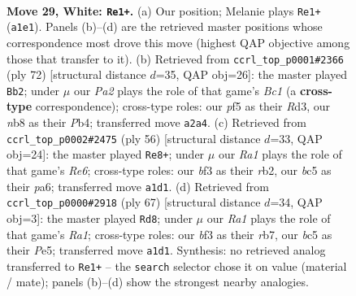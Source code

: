 \documentclass[11pt]{article}
\begin{document}
\clearpage

\begin{figure}[p]\centering
\begin{subfigure}{0.46\textwidth}\centering
\resizebox{\linewidth}{!}{%
\newchessgame
\chessboard[
  setfen={1n2k3/8/8/ppb2p2/8/5b2/P4r2/R5K1 w - - 0 29},
  showmover=false,
  pgfstyle=straightmove, color=movearrow, markmove={a1-e1}
]}
\caption{}
\end{subfigure}\hfill
\begin{subfigure}{0.46\textwidth}\centering
\resizebox{\linewidth}{!}{%
\newchessgame
\chessboard[
  setfen={8/pp4p1/4k3/8/1P2n3/3R4/P4b1K/R1B3r1 w - - 1 37},
  showmover=false,
  pgfstyle=straightmove, color=movearrow, markmove={c1-b2}
]}
\caption{}
\end{subfigure}
\\[4pt]
\begin{subfigure}{0.46\textwidth}\centering
\resizebox{\linewidth}{!}{%
\newchessgame
\chessboard[
  setfen={2k5/6R1/p1p1R3/8/8/2P5/Pr1r4/4K3 w - - 0 29},
  showmover=false,
  pgfstyle=straightmove, color=movearrow, markmove={e6-e8}
]}
\caption{}
\end{subfigure}\hfill
\begin{subfigure}{0.46\textwidth}\centering
\resizebox{\linewidth}{!}{%
\newchessgame
\chessboard[
  setfen={r4k2/1RR3p1/p7/4p3/8/5PP1/7r/5K2 b - - 2 34},
  showmover=false,
  pgfstyle=straightmove, color=movearrow, markmove={a8-d8}
]}
\caption{}
\end{subfigure}
\caption{\textbf{Move 29, White: \texttt{Re1+}.} (a) Our position; Melanie plays \texttt{Re1+} (\texttt{a1e1}). Panels (b)--(d) are the retrieved master positions whose correspondence most drove this move (highest QAP objective among those that transfer to it). (b) Retrieved from \texttt{ccrl\_top\_p0001\#2366} (ply 72) [structural distance $d$=35, QAP obj=26]: the master played \texttt{Bb2}; under $\mu$ our \emph{Pa2} plays the role of that game's \emph{Bc1} (a \textbf{cross-type} correspondence); cross-type roles: our \emph{p}f5 as their \emph{R}d3, our \emph{n}b8 as their \emph{P}b4; transferred move \texttt{a2a4}. (c) Retrieved from \texttt{ccrl\_top\_p0002\#2475} (ply 56) [structural distance $d$=33, QAP obj=24]: the master played \texttt{Re8+}; under $\mu$ our \emph{Ra1} plays the role of that game's \emph{Re6}; cross-type roles: our \emph{b}f3 as their \emph{r}b2, our \emph{b}c5 as their \emph{p}a6; transferred move \texttt{a1d1}. (d) Retrieved from \texttt{ccrl\_top\_p0000\#2918} (ply 67) [structural distance $d$=34, QAP obj=3]: the master played \texttt{Rd8}; under $\mu$ our \emph{Ra1} plays the role of that game's \emph{Ra1}; cross-type roles: our \emph{b}f3 as their \emph{r}b7, our \emph{b}c5 as their \emph{P}e5; transferred move \texttt{a1d1}. Synthesis: no retrieved analog transferred to \texttt{Re1+} -- the \texttt{search} selector chose it on value (material / mate); panels (b)--(d) show the strongest nearby analogies.}
\label{fig:thought-m56}
\end{figure}
\end{document}
